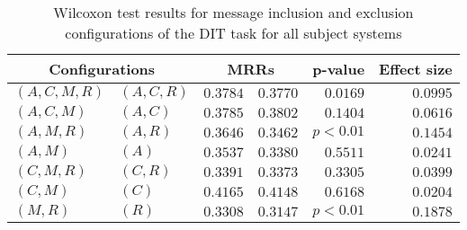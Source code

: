 
\begin{table}
\begin{spacing}{1.2}
\centering
\caption{Wilcoxon test results for message inclusion and exclusion configurations of the DIT task for all subject systems}
\label{table:versus-wilcox-all-dit-message}
\begin{tabular}{ll|rr|rr}
\toprule
      \multicolumn{2}{c|}{Configurations} &          \multicolumn{2}{c|}{MRRs} &       p-value & Effect size \\
\midrule
 $(A,C,M,R)$ &  $(A,C,R)$ & $0.3784$ & $0.3770$ & $0.0169$ &    $0.0995$ \\
   $(A,C,M)$ &    $(A,C)$ & $0.3785$ & $0.3802$ & $0.1404$ &    $0.0616$ \\
   $(A,M,R)$ &    $(A,R)$ & $0.3646$ & $0.3462$ & $p<0.01$ &    $0.1454$ \\
     $(A,M)$ &      $(A)$ & $0.3537$ & $0.3380$ & $0.5511$ &    $0.0241$ \\
   $(C,M,R)$ &    $(C,R)$ & $0.3391$ & $0.3373$ & $0.3305$ &    $0.0399$ \\
     $(C,M)$ &      $(C)$ & $0.4165$ & $0.4148$ & $0.6168$ &    $0.0204$ \\
     $(M,R)$ &      $(R)$ & $0.3308$ & $0.3147$ & $p<0.01$ &    $0.1878$ \\
\bottomrule
\end{tabular}

\end{spacing}
\end{table}

